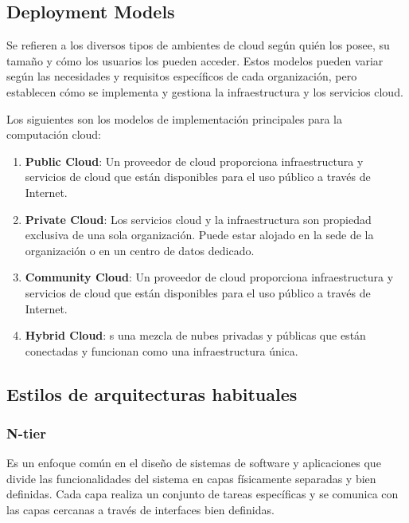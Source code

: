 \documentclass{article}
\begin{document}
		\subsection{Deployment Models}
		Se refieren a los diversos tipos de ambientes de cloud según quién los posee, su tamaño y cómo los usuarios los pueden acceder. Estos modelos pueden variar según las necesidades y requisitos específicos de cada organización, pero establecen cómo se implementa y gestiona la infraestructura y los servicios cloud.
		
		
		Los siguientes son los modelos de implementación principales para la computación cloud:

		\begin{enumerate}
			
			\item {\textbf{Public Cloud}}: Un proveedor de cloud proporciona infraestructura y servicios de cloud que están disponibles para el uso público a través de Internet.

			\item {\textbf{Private Cloud}}: Los servicios cloud y la infraestructura son propiedad exclusiva de una sola organización. Puede estar alojado en la sede de la organización o en un centro de datos dedicado.
			
			
			\item {\textbf{Community Cloud}}: Un proveedor de cloud proporciona infraestructura y servicios de cloud que están disponibles para el uso público a través de Internet.
			

				
			\item {\textbf{Hybrid Cloud}}: s una mezcla de nubes privadas y públicas que están conectadas y funcionan como una infraestructura única.
			
		\end{enumerate}
		
		\subsection{Estilos de arquitecturas habituales}
		
		\subsubsection{N-tier}
		Es un enfoque común en el diseño de sistemas de software y aplicaciones que divide las funcionalidades del sistema en capas físicamente separadas y bien definidas. Cada capa realiza un conjunto de tareas específicas y se comunica con las capas cercanas a través de interfaces bien definidas. 
		
\end{document}
